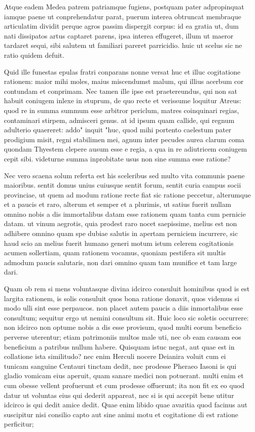  Atque eadem Medea patrem patriamque fugiens, postquam pater adpropinquat iamque paene ut conprehendatur parat, puerum interea obtruncat membraque articulatim dividit perque agros passim dispergit corpus: id ea gratia ut, dum nati dissipatos artus captaret parens, ipsa interea effugeret, illum ut maeror tardaret sequi, sibi salutem ut familiari pareret parricidio. huic ut scelus sic ne ratio quidem defuit.

 Quid ille funestas epulas fratri conparans nonne versat huc et illuc cogitatione rationem: maior mihi moles, maius miscendumst malum, qui illius acerbum cor contundam et conprimam. Nec tamen ille ipse est praetereundus, qui non sat habuit coniugem inlexe in stuprum, de quo recte et verissume loquitur Atreus: quod re in summa summum esse arbitror periclum, matres coinquinari regias, contaminari stirpem, admisceri genus. at id ipsum quam callide, qui regnum adulterio quaereret: addo" inquit "huc, quod mihi portento caelestum pater prodigium misit, regni stabilimen mei, agnum inter pecudes aurea clarum coma quondam Thyestem clepere ausum esse e regia, a qua in re adiutricem coniugem cepit sibi. videturne summa inprobitate usus non sine summa esse ratione?

 Nec vero scaena solum referta est his sceleribus sed multo vita communis paene maioribus. sentit domus unius cuiusque sentit forum, sentit curia campus socii provinciae, ut quem ad modum ratione recte fiat sic ratione peccetur, alterumque et a paucis et raro, alterum et semper et a plurimis, ut satius fuerit nullam omnino nobis a dis immortalibus datam esse rationem quam tanta cum pernicie datam. ut vinum aegrotis, quia prodest raro nocet saepissime, melius est non adhibere omnino quam spe dubiae salutis in apertam perniciem incurrere, sic haud scio an melius fuerit humano generi motum istum celerem cogitationis acumen sollertiam, quam rationem vocamus, quoniam pestifera sit multis admodum paucis salutaris, non dari omnino quam tam munifice et tam large dari.

 Quam ob rem si mens voluntasque divina idcirco consuluit hominibus quod is est largita rationem, is solis consuluit quos bona ratione donavit, quos videmus si modo ulli sint esse perpaucos. non placet autem paucis a diis inmortalibus esse consultum; sequitur ergo ut nemini consultum sit. Huic loco sic soletis occurrere: non idcirco non optume nobis a dis esse provisum, quod multi eorum beneficio perverse uterentur; etiam patrimoniis multos male uti, nec ob eam causam eos beneficium a patribus nullum habere. Quisquam istuc negat, aut quae est in collatione ista similitudo? nec enim Herculi nocere Deianira voluit cum ei tunicam sanguine Centauri tinctam dedit, nec prodesse Pheraeo Iasoni is qui gladio vomicam eius aperuit, quam sanare medici non potuerant. multi enim et cum obesse vellent profuerunt et cum prodesse offuerunt; ita non fit ex eo quod datur ut voluntas eius qui dederit appareat, nec si is qui accepit bene utitur idcirco is qui dedit amice dedit. Quae enim libido quae avaritia quod facinus aut suscipitur nisi consilio capto aut sine animi motu et cogitatione di est ratione perficitur;

